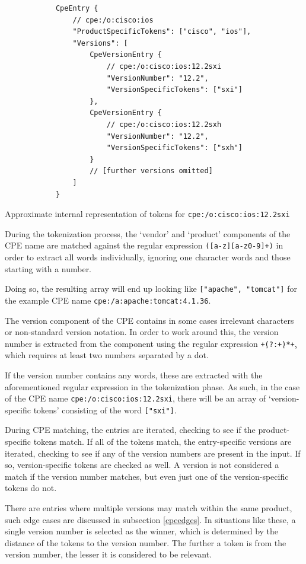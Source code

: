 \documentclass[a4paper,12pt]{article}
\begin{document}
	\begin{listing}[H]
		\begin{verbatim}
			CpeEntry {
				// cpe:/o:cisco:ios
				"ProductSpecificTokens": ["cisco", "ios"],
				"Versions": [
					CpeVersionEntry {
						// cpe:/o:cisco:ios:12.2sxi
						"VersionNumber": "12.2",
						"VersionSpecificTokens": ["sxi"]
					},
					CpeVersionEntry {
						// cpe:/o:cisco:ios:12.2sxh
						"VersionNumber": "12.2",
						"VersionSpecificTokens": ["sxh"]
					}
					// [further versions omitted]
				]
			}
		\end{verbatim}
		\caption{Approximate internal representation of tokens for \texttt{cpe:/o:cisco:ios:12.2sxi}}
		\label{ciscotokens}
	\end{listing}
	
	During the tokenization process, the `vendor' and `product' components of the CPE name are matched against the regular expression \texttt{([a-z][a-z0-9]+)} in order to extract all words individually, ignoring one character words and those starting with a number.
	
	Doing so, the resulting array will end up looking like \texttt{["apache", "tomcat"]} for the example CPE name \texttt{cpe:/a:apache:tomcat:4.1.36}.
	
	The version component of the CPE contains in some cases irrelevant characters or non-standard version notation. In order to work around this, the version number is extracted from the component using the regular expression \texttt{\d+\.(?:\d+\.)*\d+}, which requires at least two numbers separated by a dot.
	
	If the version number contains any words, these are extracted with the aforementioned regular expression in the tokenization phase. As such, in the case of the CPE name \texttt{cpe:/o:cisco:ios:12.2sxi}, there will be an array of `version-specific tokens' consisting of the word \texttt{["sxi"]}.
	
	During CPE matching, the entries are iterated, checking to see if the product-specific tokens match. If all of the tokens match, the entry-specific versions are iterated, checking to see if any of the version numbers are present in the input. If so, version-specific tokens are checked as well. A version is not considered a match if the version number matches, but even just one of the version-specific tokens do not.
	
	There are entries where multiple versions may match within the same product, such edge cases are discussed in subsection \ref{cpeedges}. In situations like these, a single version number is selected as the winner, which is determined by the distance of the tokens to the version number. The further a token is from the version number, the lesser it is considered to be relevant.
	
\end{document}
